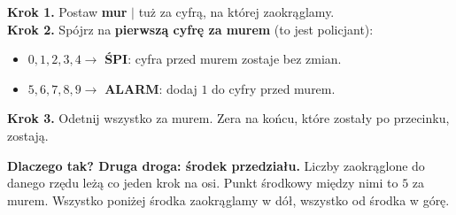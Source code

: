 \documentclass[11pt,a4paper]{article}
\begin{document}

\vspace{0.3em}
\begin{regula}
\textbf{Krok 1.} Postaw \textbf{mur} $|$ tuż za cyfrą, na której zaokrąglamy.\\
\textbf{Krok 2.} Spójrz na \textbf{pierwszą cyfrę za murem} (to jest policjant):
\begin{itemize}[leftmargin=*, itemsep=1pt]
  \item $0, 1, 2, 3, 4 \rightarrow$ \textbf{ŚPI}: cyfra przed murem zostaje bez zmian.
  \item $5, 6, 7, 8, 9 \rightarrow$ \textbf{ALARM}: dodaj $1$ do cyfry przed murem.
\end{itemize}
\textbf{Krok 3.} Odetnij wszystko za murem. Zera na końcu, które zostały po przecinku, zostają.
\end{regula}

\vspace{0.4em}
\textbf{Dlaczego tak? Druga droga: środek przedziału.} Liczby zaokrąglone do danego rzędu leżą co jeden krok na osi. Punkt środkowy między nimi to $5$ za murem. Wszystko poniżej środka zaokrąglamy w dół, wszystko od środka w górę.

\begin{center}
\end{center}
\end{document}
